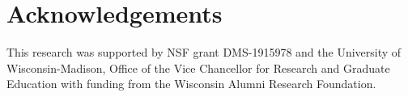\documentclass[11pt]{article}
\theoremstyle{plain}
\theoremstyle{definition}
\begin{document}






\section*{Acknowledgements}
This research was supported by NSF grant DMS-1915978 and the University of Wisconsin-Madison, Office of the Vice Chancellor for Research and Graduate Education with funding from the Wisconsin Alumni Research Foundation. 
\end{document}
